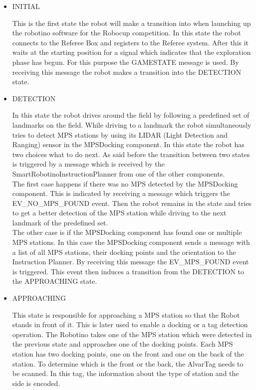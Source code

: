 \begin{itemize}

\item INITIAL 

This is the first state the robot will make a transition into when launching up the robotino software for the Robocup competition. In this state the robot connects to the Referee Box and registers to the Referee system. After this it waits at the starting position for a signal which indicates that the exploration phase has begun. For this purpose the GAMESTATE message is used. By receiving this message the robot makes a transition into the DETECTION state.   


\item DETECTION

In this state the robot drives around the field by following a predefined set of landmarks on the field. While driving to a landmark the robot simultaneously tries to detect MPS stations by using its LIDAR (Light Detection and Ranging) sensor in the MPSDocking component. In this state the robot has two choices what to do next. As said before the transition between two states is triggered by a message which is received by the SmartRobotinoInstructionPlanner from one of the other components. \\

The first case happens if there was no MPS detected by the MPSDocking component. This is indicated by receiving a message which triggers the EV\_NO\_MPS\_FOUND event. Then the robot remains in the state and tries to get a better detection of the MPS station while driving to the next landmark of the predefined set.  \\

The other case is if the MPSDocking component has found one or multiple MPS stations. In this case the MPSDocking component sends a message with a list of all MPS stations, their docking points and the orientation to the Instruction Planner. By receiving this message the EV\_MPS\_FOUND event is triggered. This event then induces a transition from the DETECTION to the APPROACHING state. 

\item APPROACHING 

This state is responsible for approaching a MPS station so that the Robot stands in front of it. This is later used to enable a docking or a tag detection operation. The Robotino takes one of the MPS station which were detected in the previous state and approaches one of the docking points. Each MPS station has two docking points, one on the front and one on the back of the station. To determine which is the front or the back, the AlvarTag needs to be scanned. In this tag, the information about the type of station and the side is encoded. \\


\end{itemize}

